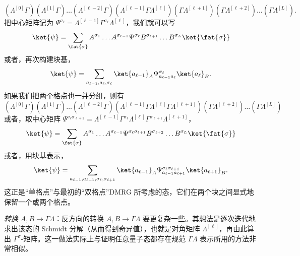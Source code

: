 \begin{equation}
(\Lambda^{[0]}\Gamma)(\Lambda^{[1]}\Gamma)\ldots(\Lambda^{[\ell-2]}\Gamma)(\Lambda^{[\ell-1]}\Gamma \Lambda^{[\ell]}) (\Gamma\Lambda^{[\ell+1]})(\Gamma\Lambda^{[\ell+2]}) \ldots (\Gamma\Lambda^{[L]}) .
\end{equation}
把中心矩阵记为 $\Psi^{\sigma_\ell}= \Lambda^{[\ell-1]}\Gamma^{\sigma_\ell} \Lambda^{[\ell]}$，我们就可以写
\begin{equation}
\ket{\psi} = \sum_{\fat{\sigma}} A^{\sigma_1} \ldots A^{\sigma_{\ell-1}} \Psi^{\sigma_\ell} B^{\sigma_{\ell+1}} \ldots B^{\sigma_L}
\ket{\fat{\sigma}}
\end{equation}
或者，再次构建块基，
\begin{equation}
\ket{\psi} = \sum_{a_{\ell-1},a_{\ell},\sigma_\ell} \ket{a_{\ell-1}}_A \Psi^{\sigma_\ell}_{a_{\ell-1}a_\ell} \ket{a_\ell}_B .
\end{equation}
如果我们把两个格点也一并分组，则有
\begin{equation}
(\Lambda^{[0]}\Gamma)(\Lambda^{[1]}\Gamma)\ldots(\Lambda^{[\ell-2]}\Gamma)(\Lambda^{[\ell-1]}\Gamma \Lambda^{[\ell]} \Gamma\Lambda^{[\ell+1]})(\Gamma\Lambda^{[\ell+2]}) \ldots (\Gamma\Lambda^{[L]}) 
\end{equation}
或者，取中心矩阵 $\Psi^{\sigma_\ell \sigma_{\ell+1}}=\Lambda^{[\ell-1]}\Gamma^{\sigma_\ell} \Lambda^{[\ell]} \Gamma^{\sigma_{\ell+1}}\Lambda^{[\ell+1]}$，
\begin{equation}
\ket{\psi} = \sum_{\fat{\sigma}} A^{\sigma_1} \ldots A^{\sigma_{\ell-1}} \Psi^{\sigma_\ell \sigma_{\ell+1}} B^{\sigma_{\ell+2}} \ldots B^{\sigma_L} \ket{\fat{\sigma}}
\end{equation}
或者，用块基表示，
\begin{equation}
\ket{\psi} = \sum_{a_{\ell-1},a_{\ell+1},\sigma_\ell,\sigma_{\ell+1}} \ket{a_{\ell-1}}_A \Psi^{\sigma_\ell \sigma_{\ell+1}}_{a_{\ell-1}a_{\ell+1}} \ket{a_{\ell+1}}_B .
\end{equation}
这正是``单格点''与最初的``双格点''DMRG 所考虑的态，它们在两个块之间显式地保留一个或两个格点。

{\em 转换} $A,B \rightarrow \Gamma\Lambda$：反方向的转换 $A,B \rightarrow \Gamma\Lambda$ 要更复杂一些。其想法是逐次迭代地求出该态的 Schmidt 分解（从而得到奇异值），也就是对角矩阵 $\Lambda^{[\ell]}$，再由此算出 $\Gamma^{\sigma}$-矩阵。这一做法实际上与证明任意量子态都存在规范 $\Gamma\Lambda$ 表示所用的方法非常相似。

